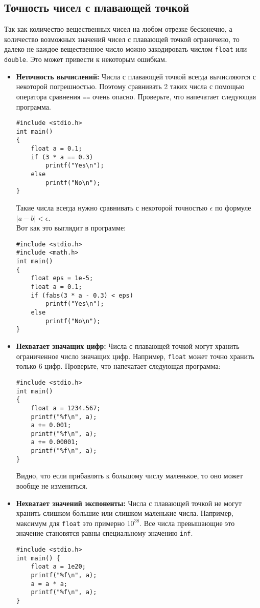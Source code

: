 \documentclass{article}
\begin{document}
\subsection*{Точность чисел с плавающей точкой}
Так как количество вещественных чисел на любом отрезке бесконечно, а количество возможных значений чисел с плавающей точкой ограничено, то далеко не каждое вещественное число можно закодировать числом \texttt{float} или \texttt{double}. Это может привести к некоторым ошибкам.
\begin{itemize}
\item \textbf{Неточность вычислений:} Числа с плавающей точкой всегда вычисляются с некоторой погрешностью. Поэтому сравнивать 2 таких числа с помощью оператора сравнения \texttt{==} очень опасно. Проверьте, что напечатает следующая программа.
\begin{lstlisting}
#include <stdio.h>
int main() 
{
    float a = 0.1;
    if (3 * a == 0.3)
        printf("Yes\n");
    else
        printf("No\n");
}
\end{lstlisting}

Такие числа всегда нужно сравнивать с некоторой точностью $\epsilon$ по формуле $|a - b| < \epsilon$.\\ 
Вот как это выглядит в программе:
\begin{lstlisting}
#include <stdio.h>
#include <math.h>
int main() 
{
    float eps = 1e-5;
    float a = 0.1;
    if (fabs(3 * a - 0.3) < eps)
        printf("Yes\n");
    else
        printf("No\n");
}
\end{lstlisting}

\item \textbf{Нехватает значащих цифр:} Числа с плавающей точкой могут хранить ограниченное число значащих цифр. Например, \texttt{float} может точно хранить только 6 цифр. Проверьте, что напечатает следующая программа:
\begin{lstlisting}
#include <stdio.h>
int main() 
{
    float a = 1234.567;
    printf("%f\n", a);
    a += 0.001;
    printf("%f\n", a);
    a += 0.00001;
    printf("%f\n", a);
}
\end{lstlisting}
Видно, что если прибавлять к большому числу маленькое, то оно может вообще не измениться.

\item \textbf{Нехватает значений экспоненты:} Числа с плавающей точкой не могут хранить слишком большие или слишком маленькие числа. Например, максимум для \texttt{float} это примерно $10^{38}$. Все числа превышающие это значение становятся равны специальному значению \texttt{inf}.
\begin{lstlisting}
#include <stdio.h>
int main() {
    float a = 1e20;
    printf("%f\n", a);
    a = a * a;
    printf("%f\n", a);
}
\end{lstlisting}
\end{itemize}
\end{document}
